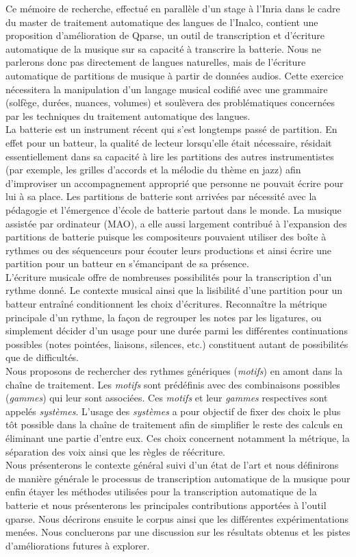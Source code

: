 Ce mémoire de recherche, effectué en parallèle d’un stage à l’Inria dans le cadre du master de traitement automatique des langues de l’Inalco, contient une proposition d’amélioration de Qparse, un outil de transcription et d’écriture automatique de la musique sur sa capacité à transcrire la batterie. Nous ne parlerons donc pas directement de langues naturelles, mais de l’écriture automatique de partitions de musique à partir de données audios. Cette exercice nécessitera la manipulation d’un langage musical codifié avec une grammaire (solfège, durées, nuances, volumes) et soulèvera des problématiques concernées par les techniques du traitement automatique des langues.\\
La batterie est un instrument récent qui s’est longtemps passé de partition. En effet pour un batteur, la qualité de lecteur lorsqu’elle était nécessaire, résidait essentiellement dans sa capacité à lire les partitions des autres instrumentistes (par exemple, les grilles d’accords et la mélodie du thème en jazz) afin d’improviser un accompagnement approprié que personne ne pouvait écrire pour lui à sa place. Les partitions de batterie sont arrivées par nécessité avec la pédagogie et l’émergence d’école de batterie partout dans le monde. La musique assistée par ordinateur (MAO), a elle aussi largement contribué à l’expansion des partitions de batterie puisque les compositeurs pouvaient utiliser des boîte à rythmes ou des séquenceurs pour écouter leurs productions et ainsi écrire une partition pour un batteur en s’émancipant de sa présence.\\
L’écriture musicale offre de nombreuses possibilités pour la transcription d’un rythme donné. Le contexte musical ainsi que la lisibilité d’une partition pour un batteur entraîné conditionnent les choix d’écritures. Reconnaître la métrique principale d’un rythme, la façon de regrouper les notes par les ligatures, ou simplement décider d’un usage pour une durée parmi les différentes continuations possibles (notes pointées, liaisons, silences, etc.) constituent autant de possibilités que de difficultés.\\
Nous proposons de rechercher des rythmes génériques (\textit{motifs}) en amont dans la chaîne de traitement. Les \textit{motifs} sont prédéfinis avec des combinaisons possibles (\textit{gammes}) qui leur sont associées. Ces \textit{motifs} et leur \textit{gammes} respectives sont appelés \textit{systèmes}. L’usage des \textit{systèmes} a pour objectif de fixer des choix le plus tôt possible dans la chaîne de traitement afin de simplifier le reste des calculs en éliminant une partie d’entre eux. Ces choix concernent notamment la métrique, la séparation des voix ainsi que les règles de réécriture.\\
Nous présenterons le contexte général suivi d’un état de l’art et nous définirons de manière générale le processus de transcription automatique de la musique pour enfin étayer les méthodes utilisées pour la transcription automatique de la batterie et nous présenterons les principales contributions apportées à l’outil qparse. Nous décrirons ensuite le corpus ainsi que les différentes expérimentations menées. Nous concluerons par une discussion sur les résultats obtenus et les pistes d’améliorations futures à explorer.